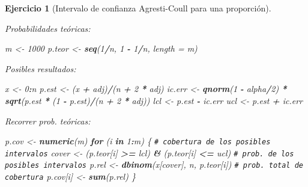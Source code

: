 \documentclass[
  spanish,
  10pt,
]{book}
\newenvironment{Shaded}{\begin{snugshade}}{\end{snugshade}}
\newcommand{\AttributeTok}[1]{\textcolor[rgb]{0.13,0.29,0.53}{#1}}
\newcommand{\CommentTok}[1]{\textcolor[rgb]{0.56,0.35,0.01}{\textit{#1}}}
\newcommand{\ControlFlowTok}[1]{\textcolor[rgb]{0.13,0.29,0.53}{\textbf{#1}}}
\newcommand{\DecValTok}[1]{\textcolor[rgb]{0.00,0.00,0.81}{#1}}
\newcommand{\FunctionTok}[1]{\textcolor[rgb]{0.13,0.29,0.53}{\textbf{#1}}}
\newcommand{\NormalTok}[1]{#1}
\newcommand{\OtherTok}[1]{\textcolor[rgb]{0.56,0.35,0.01}{#1}}
\newcommand{\SpecialCharTok}[1]{\textcolor[rgb]{0.81,0.36,0.00}{\textbf{#1}}}
\theoremstyle{break}
\newtheorem{exercise}{Ejercicio}[chapter]
\theoremstyle{nonumberplain}
\renewcommand{\CommentTok}[1]{\textcolor[rgb]{0.41,0.41,0.41}{\texttt{#1}}}
\begin{document}
\begin{exercise}[Intervalo de confianza Agresti-Coull para una proporción]
\begin{enumerate}
  Probabilidades teóricas:

\begin{Shaded}
\begin{Highlighting}[]
\NormalTok{m }\OtherTok{\textless{}{-}} \DecValTok{1000}
\NormalTok{p.teor }\OtherTok{\textless{}{-}} \FunctionTok{seq}\NormalTok{(}\DecValTok{1}\SpecialCharTok{/}\NormalTok{n, }\DecValTok{1} \SpecialCharTok{{-}} \DecValTok{1}\SpecialCharTok{/}\NormalTok{n, }\AttributeTok{length =}\NormalTok{ m) }
\end{Highlighting}
\end{Shaded}

  Posibles resultados:

\begin{Shaded}
\begin{Highlighting}[]
\NormalTok{x }\OtherTok{\textless{}{-}} \DecValTok{0}\SpecialCharTok{:}\NormalTok{n}
\NormalTok{p.est }\OtherTok{\textless{}{-}}\NormalTok{ (x }\SpecialCharTok{+}\NormalTok{ adj)}\SpecialCharTok{/}\NormalTok{(n }\SpecialCharTok{+} \DecValTok{2} \SpecialCharTok{*}\NormalTok{ adj) }
\NormalTok{ic.err }\OtherTok{\textless{}{-}} \FunctionTok{qnorm}\NormalTok{(}\DecValTok{1} \SpecialCharTok{{-}}\NormalTok{ alpha}\SpecialCharTok{/}\DecValTok{2}\NormalTok{) }\SpecialCharTok{*} \FunctionTok{sqrt}\NormalTok{(p.est }\SpecialCharTok{*}\NormalTok{ (}\DecValTok{1} \SpecialCharTok{{-}}\NormalTok{ p.est)}\SpecialCharTok{/}\NormalTok{(n }\SpecialCharTok{+} \DecValTok{2} \SpecialCharTok{*}\NormalTok{ adj))  }
\NormalTok{lcl }\OtherTok{\textless{}{-}}\NormalTok{ p.est }\SpecialCharTok{{-}}\NormalTok{ ic.err }
\NormalTok{ucl }\OtherTok{\textless{}{-}}\NormalTok{ p.est }\SpecialCharTok{+}\NormalTok{ ic.err }
\end{Highlighting}
\end{Shaded}

  Recorrer prob. teóricas:

\begin{Shaded}
\begin{Highlighting}[]
\NormalTok{p.cov }\OtherTok{\textless{}{-}} \FunctionTok{numeric}\NormalTok{(m)}
\ControlFlowTok{for}\NormalTok{ (i }\ControlFlowTok{in} \DecValTok{1}\SpecialCharTok{:}\NormalTok{m) \{}
  \CommentTok{\# cobertura de los posibles intervalos}
\NormalTok{  cover }\OtherTok{\textless{}{-}}\NormalTok{ (p.teor[i] }\SpecialCharTok{\textgreater{}=}\NormalTok{ lcl) }\SpecialCharTok{\&}\NormalTok{ (p.teor[i] }\SpecialCharTok{\textless{}=}\NormalTok{ ucl)  }
  \CommentTok{\# prob. de los posibles intervalos}
\NormalTok{  p.rel }\OtherTok{\textless{}{-}} \FunctionTok{dbinom}\NormalTok{(x[cover], n, p.teor[i])           }
  \CommentTok{\# prob. total de cobertura}
\NormalTok{  p.cov[i] }\OtherTok{\textless{}{-}} \FunctionTok{sum}\NormalTok{(p.rel)                            }
\NormalTok{\}}
\end{Highlighting}
\end{Shaded}


\end{enumerate}
\end{exercise}
\end{document}
